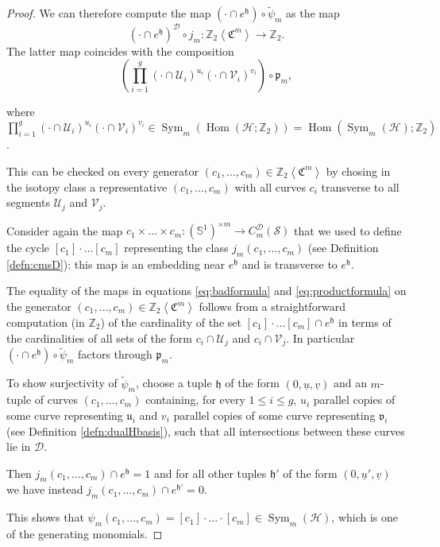 \documentclass{amsart}
\theoremstyle{plain}
\theoremstyle{definition}
\newcommand{\cC}{\mathfrak{C}}
\newcommand{\D}{\mathcal{D}}
\renewcommand{\H}{\mathcal{H}}
\renewcommand{\S}{\mathcal{S}}
\newcommand{\U}{\mathcal{U}}
\renewcommand{\u}{\mathfrak{u}}
\newcommand{\V}{\mathcal{V}}
\renewcommand{\v}{\mathfrak{v}}
\newcommand{\Z}{\mathbb{Z}}
\newcommand{\cmsD}{C_{m}^{\D}(\S)}
\renewcommand{\j}{j}
\newcommand{\pr}{\mathfrak{p}}
\newcommand{\tup}{\mathfrak{h}}
\newcommand{\ZcC}[1]{\Z_2\left<\cC^{#1}\right>}
\newcommand{\tpsi}{\tilde\psi}
\newcommand{\pa}[1]{\left(#1\right)}
\newcommand{\Sone}{\mathbb{S}^1}
\newcommand{\uu}{\underline{u}}
\newcommand{\uv}{\underline{v}}
\DeclareMathOperator{\Sym}{Sym}
\DeclareMathOperator{\Hom}{Hom}
\begin{document}
\begin{proof}
We can therefore compute the map $(\cdot\cap e^{\tup})\circ\tpsi_m$ as the map 
\begin{equation}
\label{eq:badformula}
(\cdot\cap e^{\tup})^{\D}\circ\j_m\colon \ZcC{m}\to\Z_2.
\end{equation}
The latter map coincides with the composition
\begin{equation}
 \label{eq:productformula}
\pa{ \prod_{i=1}^g(\cdot\cap\U_i)^{u_i}(\cdot\cap\V_i)^{v_i}}\circ\pr_m,
\end{equation}

where $\prod_{i=1}^g(\cdot\cap\U_i)^{u_i}(\cdot\cap\V_i)^{v_i}\in\Sym_m(\Hom(\H;\Z_2))=\Hom\pa{\Sym_m(\H);\Z_2}$.

This can be checked on every generator $(c_1,\dots, c_m)\in\ZcC{m}$ by chosing in the isotopy class a representative $(c_1,\dots, c_m)$
with all curves $c_i$ transverse to all segments $\U_j$ and $\V_j$.

Consider again the map $c_1\times\dots\times c_m\colon \pa{\Sone}^{\times m}\to\cmsD$ that we used to define the cycle $[c_1]\cdot\dots[c_m]$
representing the class $\j_m(c_1,\dots,c_m)$ (see Definition \ref{defn:cmsD}):
this map is an embedding near $e^{\tup}$ and is transverse to $e^{\tup}$.

The equality of the maps in equations \eqref{eq:badformula} and \eqref{eq:productformula} on the generator $(c_1,\dots,c_m)\in\ZcC{m}$
follows from a straightforward
computation (in $\Z_2$) of the cardinality of the set $[c_1]\cdot\dots[c_m]\cap e^{\tup}$ in terms
of the cardinalities of all sets of the form $c_i\cap\U_j$ and $c_i\cap \V_j$.
In particular $(\cdot\cap e^{\tup})\circ\tpsi_m$ factors through $\pr_m$.

To show surjectivity of $\tpsi_m$, choose a tuple $\tup$ of the form $(0,\uu,\uv)$
and an $m$-tuple of curves $(c_1,\dots,c_m)$ containing, for every $1\leq i\leq g$, $u_i$ parallel
copies of some curve representing $\u_i$ and $v_i$ parallel copies of some curve representing
$\v_i$ (see Definition \ref{defn:dualHbasis}), such that all intersections between these curves
lie in $\D$.

Then $j_m(c_1,\dots,c_m)\cap e^{\tup}=1$ and for all
other tuples $\tup'$ of the form $(0,\uu',\uv)$ we have instead $j_m(c_1,\dots,c_m)\cap e^{\tup'}=0$.

This shows that $\psi_m(c_1,\dots,c_m)=[c_1]\cdot\ldots\cdot[c_m]\in\Sym_m(\H)$, which is
one of the generating monomials.
\end{proof}
\end{document}
